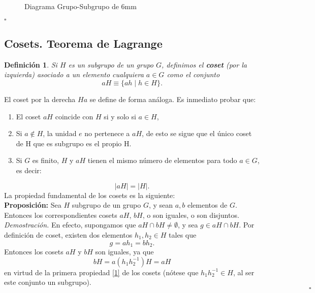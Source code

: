 \documentclass{report}
\newtheorem{definition}{Definición}
\begin{document}
\begin{figure}[h!]
\caption{Diagrama Grupo-Subgrupo de 6mm}
\label{raizatq}
\end{figure}








\hfill $\square$
















\subsection{Cosets. Teorema de Lagrange}
\begin{definition}
Si \( H \) es un subgrupo de un grupo \( G \), definimos el \textbf{coset} (por la izquierda) asociado a un elemento cualquiera \( a \in G \) como el conjunto
\[
aH \equiv \{ ah \mid h \in H \}.
\]
\end{definition}
El coset por la derecha \( Ha \) se define de forma análoga. Es inmediato probar que:

\begin{enumerate}
    \item \label{1} El coset \( aH \) coincide con \( H \) si y solo si \( a \in H \),
    \item Si \( a \notin H \), la unidad \( e \) no pertenece a \( aH \), de esto se sigue que el único coset de H que es subgrupo es el propio H.
    \item Si \( G \) es finito, \( H \) y \( aH \) tienen el mismo número de elementos para todo \( a \in G \), es decir:
\end{enumerate}
\[
|aH| = |H|.
\]
La propiedad fundamental de los cosets es la siguiente:\\
\vspace{.2cm}
\textbf{Proposición:}
Sea \( H \) subgrupo de un grupo \( G \), y sean \( a, b \) elementos de \( G \). Entonces los correspondientes cosets \( aH \), \( bH \), o son iguales, o son disjuntos.\\



\textit{Demostración.} En efecto, supongamos que \( aH \cap bH \neq \emptyset \), y sea \( g \in aH \cap bH \). Por definición de coset, existen dos elementos \( h_1, h_2 \in H \) tales que
\[
g = ah_1 = bh_2.
\]
Entonces los cosets \( aH \) y \( bH \) son iguales, ya que
\[
bH = a(h_1 h_2^{-1})H = aH
\]
en virtud de la primera propiedad \ref{1} de los cosets (nótese que \( h_1 h_2^{-1} \in H \), al ser este conjunto un subgrupo). 
\[\hspace{18cm}\square\]
\end{document}
